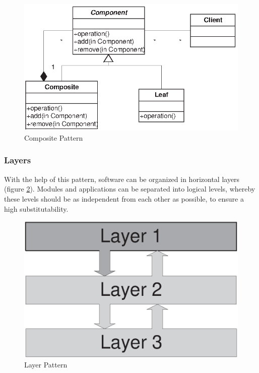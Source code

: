 \begin{figure}[ht]
    \begin{center}
       \includegraphics[scale=0.7]{eps/compositum.eps}
       \caption{Composite Pattern}
       \label{composite_figure}
    \end{center}
\end{figure}

\subsubsection{Layers}
\label{layers_heading}

With the help of this pattern, software can be organized in horizontal layers
(figure \ref{layer_figure}). Modules and applications can be separated into logical
levels, whereby these levels should be as independent from each other as possible,
to ensure a high substitutability.

\begin{figure}[ht]
    \begin{center}
       \includegraphics[scale=0.5]{eps/3-Tier-1.eps}
       \caption{Layer Pattern}
       \label{layer_figure}
    \end{center}
\end{figure}

